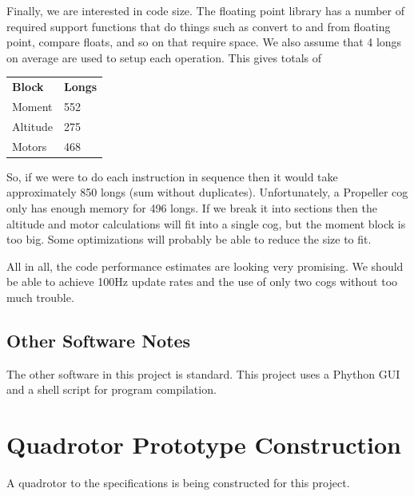 \documentclass{article}
\numberwithin{equation}{section} %
\begin{document}
Finally, we are interested in code size. The floating point library has a number of required support functions that do things such as convert to and from floating point, compare floats, and so on that require space. We also assume that 4 longs on average are used to setup each operation. This gives totals of
\begin{longtable}{l l}
	\textbf{Block} & \textbf{Longs} \\
	Moment		& 552 \\
	Altitude	& 275 \\
	Motors		& 468 \\
\end{longtable}

So, if we were to do each instruction in sequence then it would take approximately 850 longs (sum without duplicates). Unfortunately, a Propeller cog only has enough memory for 496 longs. If we break it into sections then the altitude and motor calculations will fit into a single cog, but the moment block is too big. Some optimizations will probably be able to reduce the size to fit.

All in all, the code performance estimates are looking very promising. We should be able to achieve 100Hz update rates and the use of only two cogs without too much trouble.

\subsection{Other Software Notes}
The other software in this project is standard. This project uses a Phython GUI and a shell script for program compilation.



  

\section{Quadrotor Prototype Construction}
A quadrotor to the specifications is being constructed for this project.
\end{document}
